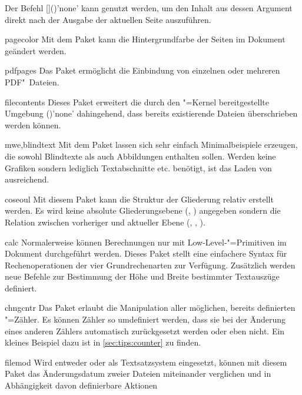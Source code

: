 \begin{packages}
  Der Befehl [\PParameter{\dots}]()'none' 
  kann genutzt werden, um den Inhalt aus dessen Argument direkt nach der 
  Ausgabe der aktuellen Seite auszuführen.
\item[pagecolor]
  Mit dem Paket kann die Hintergrundfarbe der Seiten im Dokument geändert 
  werden.
\item[pdfpages]
  Das Paket ermöglicht die Einbindung von einzelnen oder mehreren PDF"~Dateien.
\item[filecontents]
  Dieses Paket erweitert die durch den "=Kernel bereitgestellte 
  Umgebung ()'none' dahingehend,
  dass bereits existierende Dateien überschrieben werden können.
\item[mwe,blindtext]
  Mit dem Paket  lassen sich sehr einfach Minimalbeispiele 
  erzeugen, die sowohl Blindtexte als auch Abbildungen enthalten sollen. Werden 
  keine Grafiken sondern lediglich Textabschnitte etc. benötigt, ist das Laden 
  von  ausreichend.
\item[coseoul]
  Mit diesem Paket kann die Struktur der Gliederung relativ erstellt werden. 
  Es wird keine absolute Gliederungsebene (, ) 
  angegeben sondern die Relation zwischen vorheriger und aktueller Ebene 
  (, , ).
\item[calc]
  Normalerweise können Berechnungen nur mit Low-Level-"=Primitiven 
  im Dokument durchgeführt werden. Dieses Paket stellt eine einfachere Syntax 
  für Rechenoperationen der vier Grundrechenarten zur Verfügung. Zusätzlich 
  werden neue Befehle zur Bestimmung der Höhe und Breite bestimmter Textauszüge 
  definiert.
\item[chngcntr]
  Das Paket erlaubt die Manipulation aller möglichen, bereits definierten 
  "=Zähler. Es können Zähler so umdefiniert werden, dass sie bei 
  der Änderung eines anderen Zählers automatisch zurückgesetzt werden oder eben 
  nicht. Ein kleines Beispiel dazu ist in \autoref{sec:tips:counter} zu finden.
\item[filemod]
  Wird entweder  oder  als Textsatzsystem 
  eingesetzt, können mit diesem Paket das Änderungsdatum zweier Dateien 
  miteinander verglichen und in Abhängigkeit davon definierbare Aktionen 

\end{packages}
